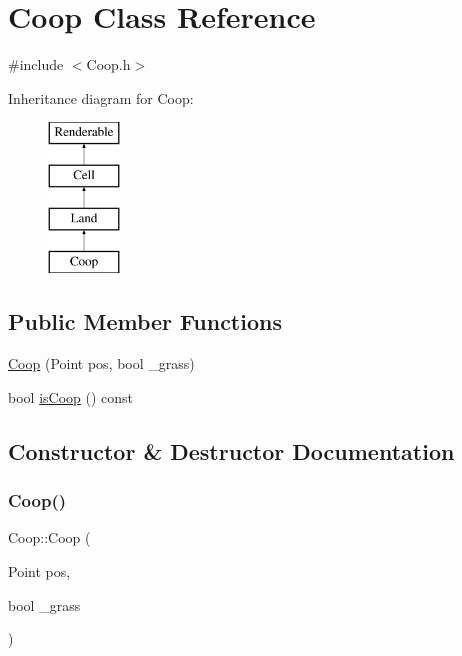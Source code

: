 \hypertarget{classCoop}{}\section{Coop Class Reference}
\label{classCoop}


{\ttfamily \#include $<$Coop.\+h$>$}

Inheritance diagram for Coop\+:\begin{figure}[H]
\begin{center}
\leavevmode
\includegraphics[height=4.000000cm]{classCoop}
\end{center}
\end{figure}
\subsection*{Public Member Functions}
\begin{DoxyCompactItemize}
\item 
\mbox{\hyperlink{classCoop_ae3ecbee4e01a7ebca0a2e9e088b7dd88}{Coop}} (Point pos, bool \+\_\+grass)
\item 
bool \mbox{\hyperlink{classCoop_af611b31347d3a8cf2304af22ecbfc450}{is\+Coop}} () const
\end{DoxyCompactItemize}


\subsection{Constructor \& Destructor Documentation}
\mbox{\label{classCoop_ae3ecbee4e01a7ebca0a2e9e088b7dd88}} 
\subsubsection{\texorpdfstring{Coop()}{Coop()}}
{\footnotesize\ttfamily Coop\+::\+Coop (\begin{DoxyParamCaption}\item[{Point}]{pos,  }\item[{bool}]{\+\_\+grass }\end{DoxyParamCaption})}



